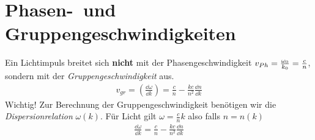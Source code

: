 \section{Phasen-~und Gruppengeschwindigkeiten}
Ein Lichtimpuls breitet sich \textbf{nicht} mit der
Phasengeschwindigkeit $v_{Ph}=\frac{\omega_0}{k_0}=\frac{c}{n}$,
sondern mit der \emph{Gruppengeschwindigkeit}%
%
aus. 
\begin{gather}
  v_{gr}=\left(\frac{\dd \omega}{\dd k}\right)=\frac{c}{n}-\frac{kc}{n^2}\frac{\dd n}{\dd k}
\end{gather}
Wichtig! Zur Berechnung der Gruppengeschwindigkeit benötigen wir die
\emph{Dispersionrelation} $\omega(k)$. Für Licht gilt
$\omega=\frac{c}{n}k$ also falls $n=n(k)$
\begin{gather*}
  \frac{\dd \omega}{\dd k}=\frac{c}{n}-\frac{kc}{n^2}\frac{\dd n}{\dd k}
\end{gather*}







